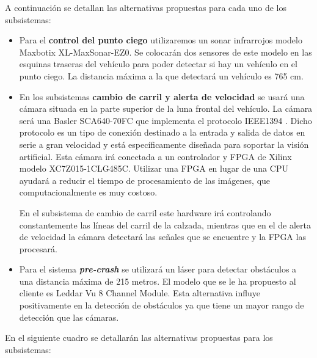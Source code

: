 \par A continuación se detallan las alternativas propuestas para cada uno de los subsistemas:
\begin{itemize}[-]
    \item Para el \textbf{control del punto ciego} utilizaremos un sonar infrarrojos modelo Maxbotix XL-MaxSonar-EZ0. Se colocarán dos sensores de este modelo en las esquinas traseras del vehículo para poder detectar si hay un vehículo en el punto ciego. La distancia máxima a la que detectará un vehículo es 765 cm.
    \item En los subsistemas \textbf{cambio de carril y alerta de velocidad} se usará una cámara situada en la parte superior de la luna frontal del vehículo. La cámara será una Basler SCA640-70FC que implementa el protocolo IEEE1394 \cite{WEB:IEEE1394} \cite{WEB:NatInstruments}. Dicho protocolo es un tipo de conexión destinado a la entrada y salida de datos en serie a gran velocidad y está específicamente diseñada para soportar la visión artificial.
    Esta cámara irá conectada a un controlador y FPGA de Xilinx modelo XC7Z015-1CLG485C. Utilizar una FPGA en lugar de una CPU ayudará a reducir el tiempo de procesamiento de las imágenes, que computacionalmente es muy costoso.

    En el subsistema de cambio de carril este hardware irá controlando constantemente las líneas del carril de la calzada, mientras que en el de alerta de velocidad la cámara detectará las señales que se encuentre y la FPGA las procesará.
    \item Para el sistema \textbf{\textit{pre-crash}}  se utilizará un láser para detectar obstáculos a una distancia máxima de 215 metros. El modelo que se le ha propuesto al cliente es Leddar Vu 8 Channel Module. Esta alternativa influye positivamente en la detección de obstáculos ya que tiene un mayor rango de detección que las cámaras.

\end{itemize}
\par En el siguiente cuadro se detallarán las alternativas propuestas para los subsistemas:

